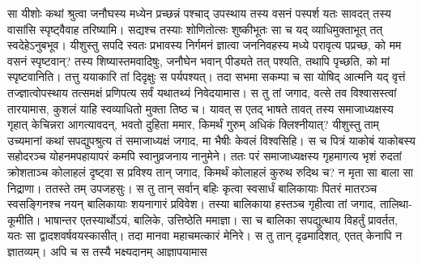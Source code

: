 \vakya सा यीशोः कथां श्रुत्वा जनौघस्य मध्येन प्रच्छन्नं पश्चाद् उपस्थाय तस्य वसनं पस्पर्श
\vakya यतः सावदत् तस्य वासांसि स्पृष्ट्वैवाह तरिष्यामि।
\vakya सद्यश्च तस्याः शोणितोत्सः शुष्कीभूतः सा च यद् व्याधिमुक्ताभूत् तत् स्वदेहेऽनुबभूव।
\vakya यीशुस्तु सपदि स्वतः प्रभावस्य निर्गमनं ज्ञात्वा जननिवहस्य मध्ये परावृत्य पप्रच्छ, को मम वसनं स्पृष्टवान्?
\vakya तस्य शिष्यास्तमवादिषुः, जनौघेन भवान् पीड्यते तत् पश्यति, तथापि पृच्छति, को मां स्पृष्टवानिति।
\vakya तत्तु ययाकारि तां दिदृक्षुः स पर्यपश्यत्।
\vakya तदा सभमा सकम्पा च सा योषिद् आत्मनि यद् वृत्तं तज्ज्ञात्वोपस्थाय तत्समक्षं प्रणिपत्य सर्वं यथातथ्यं निवेदयामास।
\vakya स तु तां जगाद, वत्से तव विश्वासस्त्वां तारयामास, कुशलं याहि स्वव्याधितो मुक्ता तिष्ठ च।
\vakya यावत् स एतद् भाषते तावत् तस्य समाजाध्यक्षस्य गृहात् केचिन्नरा आगत्यावदन्, भवतो दुहिता ममार, किमर्थं गुरुम् अधिकं क्लिश्नीयात्?
\vakya यीशुस्तु ताम् उच्यमानां कथां सपद्युपश्रुत्य तं समाजाध्यक्षं जगाद, मा भैषीः केवलं विश्वसिहि।
\vakya स च पित्रं याकोबं याकोबस्य सहोदरञ्च योहनमपहायापरं कमपि स्वानुव्रजनाय नानुमेने।
\vakya ततः परं समाजाध्यक्षस्य गृहमागत्य भृशं रुदतां क्रोशताञ्च कोलाहलं दृष्ट्वा स प्रविश्य तान् जगाद,
\vakya किमर्थं कोलाहलं कुरुथ रुदिथ च? न मृता सा बाला सा निद्राणा।
\vakya ततस्ते तम् उपजहसुः। स तु तान् सर्वान् बहिः कृत्वा स्वसार्धं बालिकायाः पितरं मातरञ्च स्वसङ्गिनश्च नयन् बालिकायाः शयनागारं प्रविवेश।
\vakya तस्या बालिकाया हस्तञ्च गृहीत्वा तां जगाद, तालिथा-कूमीति। भाषान्तर एतस्यार्थोऽयं, बालिके, उत्तिष्ठेति ममाज्ञा।
\vakya सा च बालिका सपद्युत्थाय विहर्तुं प्रावर्तत, यतः सा द्वादशवर्षवयस्कासीत्। तदा मानवा महाचमत्कारं मेनिरे।
\vakya स तु तान् दृढमादिशत्, एतत् केनापि न ज्ञातव्यम्। अपि च स तस्यै भक्ष्यदानम् आज्ञापयामास\eoc